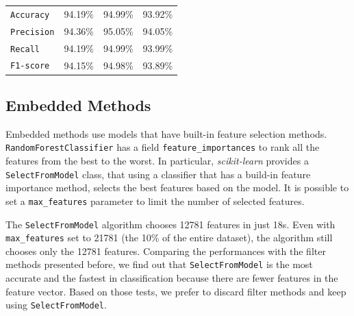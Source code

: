 \begin{table}[]
\begin{subtable}{\linewidth}
\begin{tabular}{llll}
		\texttt{Accuracy} & 94.19\% &  94.99\% &  93.92\% \\
		\texttt{Precision}  & 94.36\% & 95.05\% &   94.05\%   \\ 
		\texttt{Recall} & 94.19\%  &   94.99\%  & 93.99\% \\ 
		\texttt{F1-score}  &   94.15\%   & 94.98\% &    93.89\%      \\ 
		\bottomrule
	\end{tabular}
\end{subtable}
	
	
\end{table}


\subsection{Embedded Methods}

Embedded methods use models that have built-in feature selection methods. \texttt{RandomForestClassifier} has a field \texttt{feature\_importances} to rank all the features from the best to the worst. In particular, \textit{scikit-learn} provides a \texttt{SelectFromModel} class, that using a classifier that has a build-in feature importance method, selects the best features based on the model. It is possible to set a \texttt{max\_features} parameter to limit the number of selected features.

The \texttt{SelectFromModel} algorithm chooses 12781 features in just 18s. Even with \texttt{max\_features} set to 21781 (the 10\% of the entire dataset), the algorithm still chooses only the 12781 features. Comparing the performances with the filter methods presented before, we find out that \texttt{SelectFromModel} is the most accurate and the fastest in classification because there are fewer features in the feature vector. Based on those tests, we prefer to discard filter methods and keep using \texttt{SelectFromModel}.

